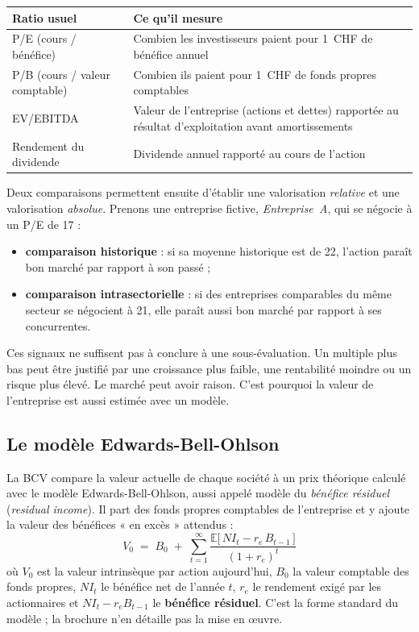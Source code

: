 \documentclass[11pt,a4paper]{article}
\begin{document}
\begin{center}\small
\begin{tabularx}{\textwidth}{@{}lX@{}}
\toprule
Ratio usuel & Ce qu'il mesure \\
\midrule
P/E (cours / bénéfice) & Combien les investisseurs paient pour 1~CHF de bénéfice annuel \\
P/B (cours / valeur comptable) & Combien ils paient pour 1~CHF de fonds propres comptables \\
EV/EBITDA & Valeur de l'entreprise (actions et dettes) rapportée au résultat d'exploitation avant amortissements \\
Rendement du dividende & Dividende annuel rapporté au cours de l'action \\
\bottomrule
\end{tabularx}
\end{center}

Deux comparaisons permettent ensuite d'établir une valorisation \emph{relative} et une valorisation \emph{absolue}. Prenons une entreprise fictive, \emph{Entreprise~A}, qui se négocie à un P/E de 17 :
\begin{itemize}[leftmargin=*]
  \item \textbf{comparaison historique} : si sa moyenne historique est de 22, l'action paraît bon marché par rapport à son passé ;
  \item \textbf{comparaison intrasectorielle} : si des entreprises comparables du même secteur se négocient à 21, elle paraît aussi bon marché par rapport à ses concurrentes.
\end{itemize}

Ces signaux ne suffisent pas à conclure à une sous-évaluation. Un multiple plus bas peut être justifié par une croissance plus faible, une rentabilité moindre ou un risque plus élevé. Le marché peut avoir raison. C'est pourquoi la valeur de l'entreprise est aussi estimée avec un modèle.

\subsection{Le modèle Edwards-Bell-Ohlson}

La BCV compare la valeur actuelle de chaque société à un prix théorique calculé avec le modèle Edwards-Bell-Ohlson, aussi appelé modèle du \emph{bénéfice résiduel} (\emph{residual income}). Il part des fonds propres comptables de l'entreprise et y ajoute la valeur des bénéfices « en excès » attendus :
\[
  \boxed{\;V_0 \;=\; B_0 \;+\; \sum_{t=1}^{\infty} \frac{\mathbb{E}\big[\,NI_t - r_e\,B_{t-1}\,\big]}{(1+r_e)^t}\;}
\]
où $V_0$ est la valeur intrinsèque par action aujourd'hui, $B_0$ la valeur comptable des fonds propres, $NI_t$ le bénéfice net de l'année $t$, $r_e$ le rendement exigé par les actionnaires et $NI_t - r_e B_{t-1}$ le \textbf{bénéfice résiduel}. C'est la forme standard du modèle ; la brochure n'en détaille pas la mise en œuvre.
\end{document}
